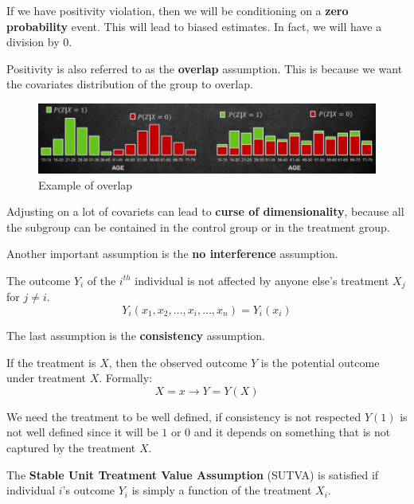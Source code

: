 If we have positivity violation, then we will be conditioning on a \textbf{zero probability}
event. This will lead to biased estimates. In fact, we will have a division by $0$.

Positivity is also referred to as the \textbf{overlap} assumption. This is because
we want the covariates distribution of the group to overlap.

\begin{figure}[!ht]
    \centering
    \includegraphics[width=\textwidth]{img/potential_outcomes/overlap.png}
    \caption{Example of overlap}
    \label{fig:positivity}
\end{figure}

Adjusting on a lot of covariets can lead to \textbf{curse of dimensionality}, because
all the subgroup can be contained in the control group or in the treatment group.

Another important assumption is the \textbf{no interference} assumption.
\begin{definition}
    The outcome $Y_i$ of the $i^{th}$ individual is not affected by anyone else's
    treatment $X_j$ for $j \neq i$.
    \begin{equation}
        Y_i(x_1, x_2, \ldots, x_i, \ldots, x_n) = Y_i(x_i)
    \end{equation}
\end{definition}

The last assumption is the \textbf{consistency} assumption.
\begin{definition}
    If the treatment is $X$, then the observed outcome $Y$ is the potential outcome
    under treatment $X$. Formally:
    \begin{equation}
        X = x \rightarrow Y = Y(X)
    \end{equation}
\end{definition}

We need the treatment to be well defined, if consistency is not respected $Y(1)$
is not well defined since it will be $1$ or $0$ and it depends on something that
is not captured by the treatment $X$.

\begin{definition}
    The \textbf{Stable Unit Treatment Value Assumption} (SUTVA) is satisfied if
    individual $i$'s outcome $Y_i$ is simply a function of the treatment $X_i$.
\end{definition}

